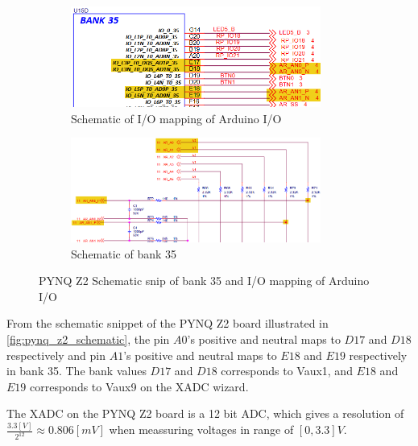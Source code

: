 \documentclass[../report.tex]{subfiles}
\begin{document}
\begin{figure}[H]
    \centering
    \begin{subfigure}[t]{0.49\textwidth}
        \centering
        \includegraphics[width=0.9\textwidth]{figures/xadc/xadc_setup_pin_1.png}
        \captionsetup{width=0.9\textwidth}
        \caption{Schematic of I/O mapping of Arduino I/O}  
        \label{}
    \end{subfigure}
    \begin{subfigure}[t]{0.49\textwidth}  
        \centering 
        \includegraphics[width=0.9\textwidth]{figures/xadc/xadc_setup_pin_2.png}
        \captionsetup{width=0.9\textwidth}
        \caption{Schematic of bank 35}  
        \label{}
    \end{subfigure}
    \caption{PYNQ Z2 Schematic snip of bank 35 and I/O mapping of Arduino I/O\cite{pynq_z2_board_schematic}} 
    \label{fig:pynq_z2_schematic}
\end{figure}

From the schematic snippet of the PYNQ Z2 board illustrated in \autoref{fig:pynq_z2_schematic}, the pin $A0$'s positive and neutral maps to $D17$ and $D18$ respectively and pin $A1$'s positive and neutral maps to $E18$ and $E19$ respectively in bank 35. The bank values $
D17$ and $D18$ corresponds to Vaux1, and $E18$ and $E19$ corresponds to Vaux9 on the XADC wizard.

The XADC on the PYNQ Z2 board is a 12 bit ADC, which gives a resolution of $\frac{3.3[V]}{2^{12}} \approx 0.806 [mV]$ when meassuring voltages in range of $[0, 3.3] V$.
\end{document}

